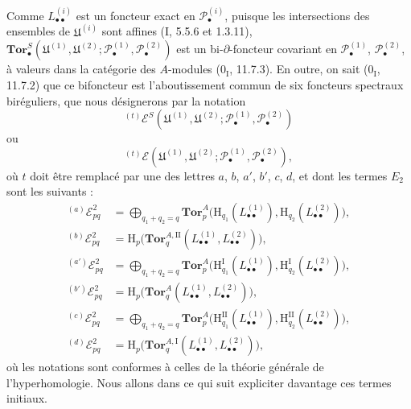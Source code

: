 \begin{env}[6.6.2]
Comme $L_{\bullet\bullet}^{(i)}$ est un foncteur exact en
$\mathscr P_\bullet^{(i)}$, puisque les intersections des ensembles
de $\mathfrak U^{(i)}$ sont affines (I, 5.5.6 et 1.3.11),
$\mathbf{Tor}_\bullet^S
(\mathfrak U^{(1)},\mathfrak U^{(2)};
 \mathscr P_\bullet^{(1)},\mathscr P_\bullet^{(2)})$ est un
bi-$\partial$-foncteur covariant en $\mathscr P_\bullet^{(1)}$,
$\mathscr P_\bullet^{(2)}$, à valeurs dans la catégorie des $A$-modules
($0_{\mathrm I}$, 11.7.3). En outre, on sait ($0_{\mathrm I}$, 11.7.2) que ce
bifoncteur est l'aboutissement commun de six foncteurs spectraux biréguliers,
que nous désignerons par la notation
\[
  {}^{(t)}\mathscr E^S
  (\mathfrak U^{(1)},\mathfrak U^{(2)};
   \mathscr P_\bullet^{(1)},\mathscr P_\bullet^{(2)})
\]
ou
\[
  {}^{(t)}\mathscr E
  (\mathfrak U^{(1)},\mathfrak U^{(2)};
   \mathscr P_\bullet^{(1)},\mathscr P_\bullet^{(2)}),
\]
où $t$ doit être remplacé par une des lettres $a$, $b$, $a'$, $b'$, $c$,
$d$, et dont les termes $E_2$ sont les suivants :
\[
\begin{aligned}
  {}^{(a)}\mathscr E_{pq}^2
  &=\bigoplus_{q_1+q_2=q}
    \mathbf{Tor}_p^A
    \bigl(\mathrm H_{q_1}(L_{\bullet\bullet}^{(1)}),
          \mathrm H_{q_2}(L_{\bullet\bullet}^{(2)})\bigr),\\
  {}^{(b)}\mathscr E_{pq}^2
  &=\mathrm H_p\bigl(
    \mathbf{Tor}_q^{A,\mathrm{II}}
    (L_{\bullet\bullet}^{(1)},L_{\bullet\bullet}^{(2)})\bigr),\\
  {}^{(a')}\mathscr E_{pq}^2
  &=\bigoplus_{q_1+q_2=q}
    \mathbf{Tor}_p^A
    \bigl(\mathrm H_{q_1}^{\mathrm I}(L_{\bullet\bullet}^{(1)}),
          \mathrm H_{q_2}^{\mathrm I}(L_{\bullet\bullet}^{(2)})\bigr),\\
  {}^{(b')}\mathscr E_{pq}^2
  &=\mathrm H_p\bigl(
    \mathbf{Tor}_q^A
    (L_{\bullet\bullet}^{(1)},L_{\bullet\bullet}^{(2)})\bigr),\\
  {}^{(c)}\mathscr E_{pq}^2
  &=\bigoplus_{q_1+q_2=q}
    \mathbf{Tor}_p^A
    \bigl(\mathrm H_{q_1}^{\mathrm{II}}(L_{\bullet\bullet}^{(1)}),
          \mathrm H_{q_2}^{\mathrm{II}}(L_{\bullet\bullet}^{(2)})\bigr),\\
  {}^{(d)}\mathscr E_{pq}^2
  &=\mathrm H_p\bigl(
    \mathbf{Tor}_q^{A,\mathrm I}
    (L_{\bullet\bullet}^{(1)},L_{\bullet\bullet}^{(2)})\bigr),
\end{aligned}
\]
où les notations sont conformes à celles de la théorie générale de
l'hyperhomologie. Nous allons dans ce qui suit expliciter davantage ces
termes initiaux.
\end{env}

